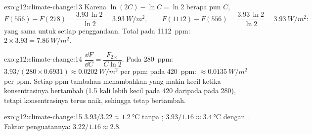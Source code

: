 \begin{solution}{exo:g12:climate-change:13}
Karena $\ln(2C) - \ln C = \ln 2$ berapa pun $C$,
\[
  F(556) - F(278) = \frac{3.93\,\ln 2}{\ln 2} = \qty{3.93}{W/m^2}, \qquad
  F(1112) - F(556) = \frac{3.93\,\ln 2}{\ln 2} = \qty{3.93}{W/m^2}:
\]
 yang sama untuk setiap penggandaan. Total pada \qty{1112}{ppm}: $2 \times 3.93 =
\qty{7.86}{W/m^2}$.
\end{solution}

\begin{solution}{exo:g12:climate-change:14}
$\dfrac{\dd F}{\dd C} = \dfrac{F_{2\times}}{C \ln 2}$. Pada \qty{280}{ppm}:
$3.93/(280 \times 0.6931) \approx \qty{0.0202}{W/m^2}$ per ppm; pada
\qty{420}{ppm}: $\approx \qty{0.0135}{W/m^2}$ per ppm. Setiap ppm tambahan
menambahkan  yang makin kecil ketika konsentrasinya bertambah (1.5 kali
lebih kecil pada 420 daripada pada 280), tetapi konsentrasinya terus naik,
sehingga  tetap bertambah.
\end{solution}

\begin{solution}{exo:g12:climate-change:15}
$3.93/3.22 \approx \qty{1.2}{\degreeCelsius}$ tanpa ;
$3.93/1.16 \approx \qty{3.4}{\degreeCelsius}$ dengan . Faktor
penguatannya: $3.22/1.16 \approx 2.8$.
\end{solution}

